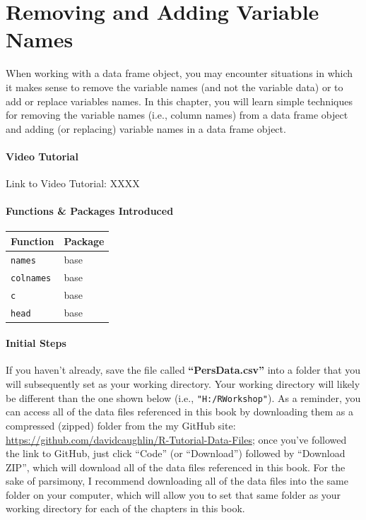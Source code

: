 \documentclass[]{book}
\begin{document}
\chapter{Removing and Adding Variable Names}\label{addnames}

When working with a data frame object, you may encounter situations in
which it makes sense to remove the variable names (and not the variable
data) or to add or replace variables names. In this chapter, you will
learn simple techniques for removing the variable names (i.e., column
names) from a data frame object and adding (or replacing) variable names
in a data frame object.

\subsubsection{Video Tutorial}\label{video-tutorial}

Link to Video Tutorial: XXXX

\subsubsection{Functions \& Packages
Introduced}\label{functions-packages-introduced}

\begin{longtable}[]{@{}ll@{}}
\toprule
Function & Package\tabularnewline
\midrule
\endhead
\texttt{names} & base\tabularnewline
\texttt{colnames} & base\tabularnewline
\texttt{c} & base\tabularnewline
\texttt{head} & base\tabularnewline
\bottomrule
\end{longtable}

\subsubsection{Initial Steps}\label{initial-steps}

If you haven't already, save the file called \textbf{``PersData.csv''}
into a folder that you will subsequently set as your working directory.
Your working directory will likely be different than the one shown below
(i.e., \texttt{"H:/RWorkshop"}). As a reminder, you can access all of
the data files referenced in this book by downloading them as a
compressed (zipped) folder from the my GitHub site:
\url{https://github.com/davidcaughlin/R-Tutorial-Data-Files}; once
you've followed the link to GitHub, just click ``Code'' (or
``Download'') followed by ``Download ZIP'', which will download all of
the data files referenced in this book. For the sake of parsimony, I
recommend downloading all of the data files into the same folder on your
computer, which will allow you to set that same folder as your working
directory for each of the chapters in this book.
\end{document}
